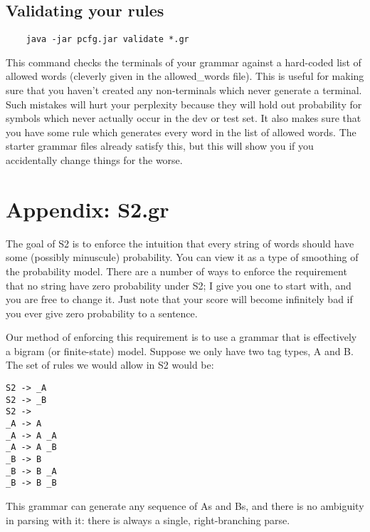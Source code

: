 \documentclass[12pt]{article}
\begin{document}
\subsection*{Validating your rules}

\begin{verbatim}
    java -jar pcfg.jar validate *.gr
\end{verbatim}

This command checks the terminals of your grammar against a hard-coded list of
allowed words (cleverly given in the allowed\_words file). This is useful for making sure that you haven't created any non-terminals which never generate a terminal. Such mistakes will hurt your perplexity because they will hold out probability for symbols which never actually occur in the dev or test set. It also makes sure that you have some rule which generates every word in the list of allowed words.  The starter grammar files already satisfy this, but this will show you if you accidentally change things for the worse.

\pagebreak{}
\section*{Appendix: S2.gr}

The goal of S2 is to enforce the intuition that every string of words should have some (possibly minuscule) probability. You can view it as a type of smoothing of the probability model. There are a number of ways to enforce the requirement that no string have zero probability under S2; I give you one to start with, and you are free to change it. Just note that your score will become infinitely bad if you ever give zero probability to a sentence.

Our method of enforcing this requirement is to use a grammar that is effectively a bigram (or finite-state) model. Suppose we only have two tag types, A and B. The set of rules we would allow in S2 would be:

\begin{verbatim}
S2 -> _A
S2 -> _B
S2 -> 
_A -> A
_A -> A _A
_A -> A _B
_B -> B
_B -> B _A
_B -> B _B
\end{verbatim}

This grammar can generate any sequence of As and Bs, and there is no ambiguity in parsing
with it: there is always a single, right-branching parse.
\end{document}
